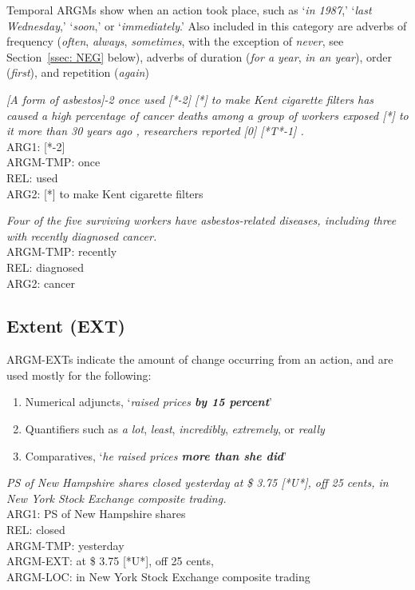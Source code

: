 \documentclass[11pt]{report}
\begin{document}
Temporal ARGMs show when an action took place, such as `\textit{in 1987},' `\textit{last Wednesday},' `\textit{soon},' or `\textit{immediately}.' Also included in this category are adverbs of frequency (\textit{often}, \textit{always}, \textit{sometimes}, with the exception of \textit{never}, see Section~\ref{ssec: NEG} below), adverbs of duration (\textit{for a year}, \textit{in an year}), order (\textit{first}), and repetition (\textit{again})

\textit{[A form of asbestos]-2 once used [*-2] [*] to make Kent cigarette filters has caused a high percentage of cancer deaths among a group of workers exposed [*] to it more than 30 years ago , researchers reported [0] [*T*-1] .}\\
ARG1: [*-2]   \\
ARGM-TMP: once\\ 
REL: used \\
ARG2: [*] to make Kent cigarette filters

\textit{Four of the five surviving workers have asbestos-related diseases, including three with recently diagnosed cancer.}\\
ARGM-TMP: recently \\
REL: diagnosed \\
ARG2: cancer 

 \subsection{Extent (EXT)}
\label{ssec: EXT}

ARGM-EXTs indicate the amount of change occurring from an action, and are used mostly for the following: 
\begin{enumerate}
\item Numerical adjuncts, `\textit{raised prices \textbf{by 15 percent}}'
\item Quantifiers such as \textit{a lot}, \textit{least}, \textit{incredibly}, \textit{extremely}, or \textit{really}
\item Comparatives, `\textit{he raised prices \textbf{more than she did}}' 
\end{enumerate}

\textit{PS of New Hampshire shares closed yesterday at \$ 3.75 [*U*], off 25 cents, in New York Stock Exchange composite trading.}\\
ARG1:        PS of New Hampshire shares\\ 
REL:        closed \\
ARGM-TMP:        yesterday\\ 
ARGM-EXT:        at \$ 3.75 [*U*], off 25 cents, \\
ARGM-LOC:        in New York Stock Exchange composite trading 
\end{document}
